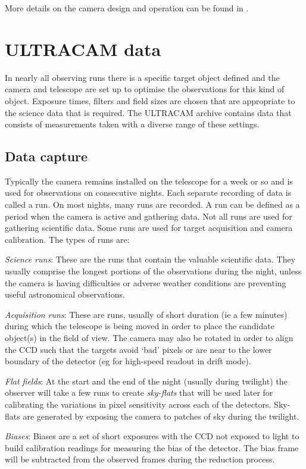 More details on the camera design and operation can be found in \citet{dhillon07}.

\section{ULTRACAM data}
In nearly all observing runs there is a specific target object defined and the camera and telescope are set up to optimise the observations for this kind of object. Exposure times, filters and field sizes are chosen that are appropriate to the science data that is required. The ULTRACAM archive contains data that consists of measurements taken with a diverse range of these settings. 

\subsection{Data capture}
Typically the camera remains installed on the telescope for a week or so and is used for observations on consecutive nights. Each separate recording of data is called a run. On most nights, many runs are recorded. A run can be defined as a period when the camera is active and gathering data. Not all runs are used for gathering scientific data. Some runs are used for target acquisition and camera calibration. The types of runs are:

\emph{Science runs}: These are the runs that contain the valuable scientific data. They usually comprise the longest portions of the observations during the night, unless the camera is having difficulties or adverse weather conditions are preventing useful astronomical observations.

\emph{Acquisition runs}: These are runs, usually of short duration (ie a few minutes) during which the telescope is being moved in order to place the candidate object(s) in the field of view. The camera may also be rotated in order to align the CCD such that the targets avoid `bad' pixels or are near to the lower boundary of the detector (eg for high-speed readout in drift mode). 

\emph{Flat fields}: At the start and the end of the night (usually during twilight) the observer will take a few runs to create \emph{sky-flats} that will be used later for calibrating the variations in pixel sensitivity across each of the detectors.  Sky-flats are generated by exposing the camera to patches of sky during the twilight. 

\emph{Biases}: Biases are a set of short exposures with the CCD not exposed to light to build calibration readings for measuring the bias of the detector. The bias frame will be subtracted from the observed frames during the reduction process. 

